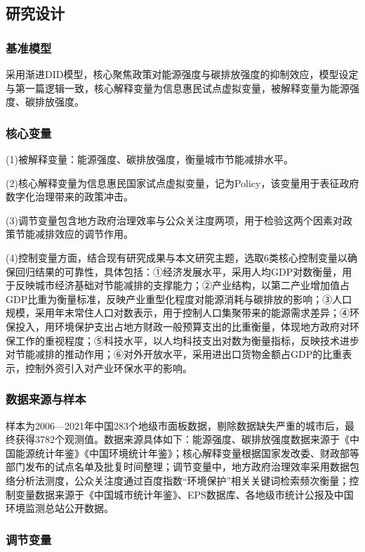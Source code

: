 \documentclass[lang=cn,a4paper,11pt]{elegantpaper}
\begin{document}
\subsection{研究设计}
\subsubsection{基准模型}
采用渐进DID模型，核心聚焦政策对能源强度与碳排放强度的抑制效应，模型设定与第一篇逻辑一致，核心解释变量为信息惠民试点虚拟变量，被解释变量为能源强度、碳排放强度。

\subsubsection{核心变量}
(1)被解释变量：能源强度、碳排放强度，衡量城市节能减排水平。

(2)核心解释变量为信息惠民国家试点虚拟变量，记为Policy，该变量用于表征政府数字化治理带来的政策冲击。

(3)调节变量包含地方政府治理效率与公众关注度两项，用于检验这两个因素对政策节能减排效应的调节作用。

(4)控制变量方面，结合现有研究成果与本文研究主题，选取6类核心控制变量以确保回归结果的可靠性，具体包括：①经济发展水平，采用人均GDP对数衡量，用于反映城市经济基础对节能减排的支撑能力；②产业结构，以第二产业增加值占GDP比重为衡量标准，反映产业重型化程度对能源消耗与碳排放的影响；③人口规模，采用年末常住人口对数表示，用于控制人口集聚带来的能源需求差异；④环保投入，用环境保护支出占地方财政一般预算支出的比重衡量，体现地方政府对环保工作的重视程度；⑤科技水平，以人均科技支出对数为衡量指标，反映技术进步对节能减排的推动作用；⑥对外开放水平，采用进出口货物金额占GDP的比重表示，控制外资引入对产业环保水平的影响。

\subsubsection{数据来源与样本}

样本为2006—2021年中国283个地级市面板数据，剔除数据缺失严重的城市后，最终获得3782个观测值。数据来源具体如下：能源强度、碳排放强度数据来源于《中国能源统计年鉴》《中国环境统计年鉴》；核心解释变量根据国家发改委、财政部等部门发布的试点名单及批复时间整理；调节变量中，地方政府治理效率采用数据包络分析法测度，公众关注度通过百度指数“环境保护”相关关键词检索频次衡量；控制变量数据来源于《中国城市统计年鉴》、EPS数据库、各地级市统计公报及中国环境监测总站公开数据。

\subsubsection{调节变量}
\end{document}

